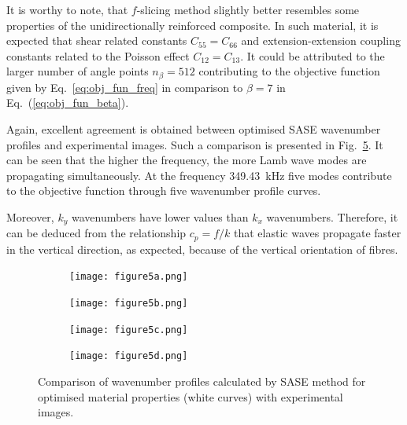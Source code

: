 \documentclass[preprint,12pt]{elsarticle}
\begin{document}
It is worthy to note, that $f$-slicing method slightly better resembles some properties of the unidirectionally reinforced composite.
In such material, it is expected that shear related constants $C_{55}=C_{66}$ and extension-extension coupling constants related to the Poisson effect $C_{12}=C_{13}$.
It could be attributed to the larger number of angle points $n_{\beta}=512$ contributing to the objective function given by Eq.~{\ref{eq:obj_fun_freq}} in comparison to $\beta=7$ in Eq.~(\ref{eq:obj_fun_beta}).

Again, excellent agreement is obtained between optimised SASE wavenumber profiles and experimental images. 
Such a comparison is presented in Fig.~\ref{fig:freq_slice_opt}.
It can be seen that the higher the frequency, the more Lamb wave modes are propagating simultaneously.
At the frequency 349.43~kHz five modes contribute to the objective function through five wavenumber profile curves.

Moreover, $k_y$ wavenumbers have lower values than $k_x$ wavenumbers.
Therefore, it can be deduced from the relationship $c_p= f / k$ that elastic waves propagate faster in the vertical direction, as expected, because of the vertical orientation of fibres.

\begin{figure} [h!]
	\centering
	\begin{subfigure}[b]{0.47\textwidth}
		\centering
		\texttt{[image: figure5a.png]}
		\label{fig:freq3_slice_opt}
	\end{subfigure}
	\hfill
	\begin{subfigure}[b]{0.47\textwidth}
		\centering
		\texttt{[image: figure5b.png]}
		\label{fig:freq4_slice_opt}
	\end{subfigure}
	\hfill
	\begin{subfigure}[b]{0.47\textwidth}
		\centering
		\texttt{[image: figure5c.png]}
		\label{fig:freq5_slice_opt}
	\end{subfigure}
	\hfill
	\begin{subfigure}[b]{0.47\textwidth}
		\centering
		\texttt{[image: figure5d.png]}
		\label{fig:freq7_slice_opt}
	\end{subfigure}
	\caption{Comparison of wavenumber profiles calculated by SASE method for optimised material properties (white curves) with experimental images.}
	\label{fig:freq_slice_opt}
\end{figure}
\end{document}
